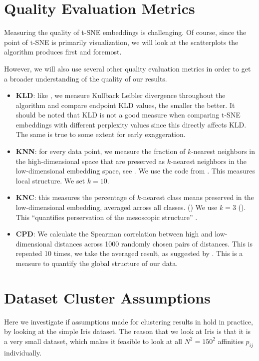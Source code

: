 \section{Quality Evaluation Metrics}
Measuring the quality of t-SNE embeddings is challenging. 
Of course, since the point of t-SNE is primarily visualization, we will look at the scatterplots the algorithm produces first and foremost. 

However, we will also use several other quality evaluation metrics in order to get a broader understanding of the quality of our results. 
\begin{itemize}
    \item \textbf{KLD}: like \cite{belkina19}, we measure Kullback Leibler divergence throughout the algorithm and compare endpoint KLD values, the smaller the better. 
    It should be noted that KLD is not a good measure when comparing t-SNE embeddings with different perplexity values since this directly affects KLD. 
    The same is true to some extent for early exaggeration.  
    \item \textbf{KNN}: for every data point, we measure the fraction of $k$-nearest neighbors in the high-di\-mension\-al space that are preserved as $k$-nearest neighbors in the low-di\-men\-sio\-nal embedding space, see \cite{KoBe19SingleCell}. 
    We use the code from . 
    This measures local structure. 
    We set $k=10$. 
    \item \textbf{KNC}: this measures the percentage of $k$-nearest class means preserved in the low-dimensional embedding, averaged across all classes. ()
    We use $k=3$ (). 
    This \enquote{quantifies perservation of the mesoscopic structure} \cite{KoBe19SingleCell}. 
    \item \textbf{CPD}: We calculate the Spearman correlation between high and low-dimensional distances across 1000 randomly chosen pairs of distances. This is repeated 10 times, we take the averaged result, as suggested by . This is a measure to quantify the global structure of our data. 
\end{itemize}

\section{Dataset Cluster Assumptions}
Here we investigate if assumptions made for clustering results in \cite{LinStei22} hold in practice, by looking at the simple Iris dataset. 
The reason that we look at Iris is that it is a very small dataset, which makes it feasible to look at all $N^2 = 150^2$ affinities $p_{ij}$ individually.  

